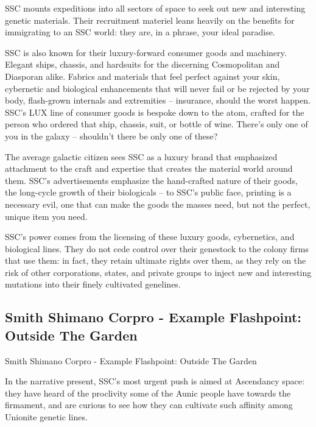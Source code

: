                                                                                                             


SSC mounts expeditions into all sectors of space to seek out new and interesting genetic  
materials. Their recruitment materiel leans heavily on the benefits for immigrating to an SSC  
world: they are, in a phrase, your ideal paradise. 
 

SSC is also known for their luxury-forward consumer goods and machinery. Elegant ships,  
chassis, and hardsuits for the discerning Cosmopolitan and Diasporan alike. Fabrics and  
materials that feel perfect against your skin, cybernetic and biological enhancements that will  
never fail or be rejected by your body, flash-grown internals and extremities -- insurance, should  
the worst happen. SSC’s LUX line of consumer goods is bespoke down to the atom, crafted for  
the person who ordered that ship, chassis, suit, or bottle of wine. There’s only one of you in the  
galaxy -- shouldn’t there be only one of these?  
 

The average galactic citizen sees SSC as a luxury brand that emphasized attachment to the craft  
and expertise that creates the material world around them. SSC’s advertisements emphasize the  
hand-crafted nature of their goods, the long-cycle growth of their biologicals -- to SSC’s public  
face, printing is a necessary evil, one that can make the goods the masses need, but not the  
perfect, unique item you need. 
 

SSC’s power comes from the licensing of these luxury goods, cybernetics, and biological lines.  
They do not cede control over their genestock to the colony firms that use them: in fact, they  
retain ultimate rights over them, as they rely on the risk of other corporations, states, and private  
groups to inject new and interesting mutations into their finely cultivated genelines.  
 
\subsection{Smith Shimano Corpro - Example Flashpoint: Outside The Garden  }
Smith Shimano Corpro - Example Flashpoint: Outside The Garden  

In the narrative present, SSC’s most urgent push is aimed at Ascendancy space: they have heard  
of the proclivity some of the Aunic people have towards the firmament, and are curious to see  
how they can cultivate such affinity among Unionite genetic lines. 
 

